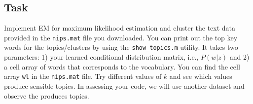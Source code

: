 \documentclass[twoside,10pt]{article}
\begin{document}
\subsection*{Task}
 Implement EM for maximum likelihood estimation and cluster the
text data provided in the \texttt{nips.mat} file you downloaded. You can print out the top key words for the topics/clusters 
by using the \texttt{show\_topics.m} utility. It takes two parameters: 1) your learned conditional distribution matrix, i.e., $P(w|z)$ and
2) a cell array of words that corresponds to the vocabulary. You can find the cell array \texttt{wl} in the \texttt{nips.mat} file.
Try different values of $k$ and see which values produce sensible topics. In assessing your code, we will use another dataset and 
observe the produces topics.

%
%
\end{document}
